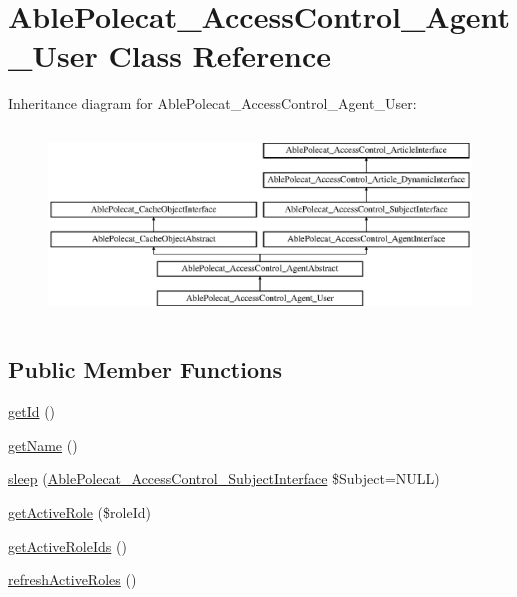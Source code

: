 \hypertarget{class_able_polecat___access_control___agent___user}{}\section{Able\+Polecat\+\_\+\+Access\+Control\+\_\+\+Agent\+\_\+\+User Class Reference}
\label{class_able_polecat___access_control___agent___user}
Inheritance diagram for Able\+Polecat\+\_\+\+Access\+Control\+\_\+\+Agent\+\_\+\+User\+:\begin{figure}[H]
\begin{center}
\leavevmode
\includegraphics[height=5.121951cm]{class_able_polecat___access_control___agent___user}
\end{center}
\end{figure}
\subsection*{Public Member Functions}
\begin{DoxyCompactItemize}
\item 
\hyperlink{class_able_polecat___access_control___agent___user_a12251d0c022e9e21c137a105ff683f13}{get\+Id} ()
\item 
\hyperlink{class_able_polecat___access_control___agent___user_a3d0963e68bb313b163a73f2803c64600}{get\+Name} ()
\item 
\hyperlink{class_able_polecat___access_control___agent___user_a365e24d7b066205cafa2a5cce3a4f224}{sleep} (\hyperlink{interface_able_polecat___access_control___subject_interface}{Able\+Polecat\+\_\+\+Access\+Control\+\_\+\+Subject\+Interface} \$Subject=N\+U\+L\+L)
\item 
\hyperlink{class_able_polecat___access_control___agent___user_a368167873f151dd37d88e11f6a5f10ad}{get\+Active\+Role} (\$role\+Id)
\item 
\hyperlink{class_able_polecat___access_control___agent___user_a8db7ea97d01a0687141844be9a76f250}{get\+Active\+Role\+Ids} ()
\item 
\hyperlink{class_able_polecat___access_control___agent___user_af655f2dcc765ece1fcd66a407d53c4cb}{refresh\+Active\+Roles} ()
\end{DoxyCompactItemize}
